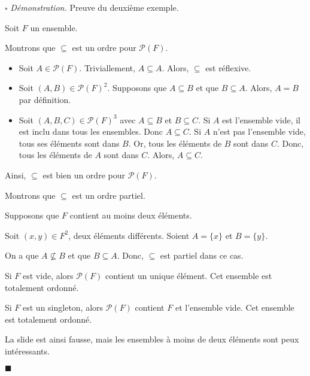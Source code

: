 \documentclass[a4paper, titlepage]{article}
\renewenvironment{proof}{\par$\square$ \footnotesize\textit{Démonstration.}}{\begin{flushright}$\blacksquare$\end{flushright}\par}
\begin{document}
    \begin{proof}
        Preuve du deuxième exemple.

        Soit $F$ un ensemble.

        Montrons que $\subseteq$ est un ordre pour $\mathcal{P}(F)$.
        \begin{itemize}
            \item Soit $A\in\mathcal{P}(F)$.
                Triviallement, $A\subseteq A$.
                Alors, $\subseteq$ est réflexive.
            \item Soit $(A,B)\in\mathcal{P}(F)^2$.
                Supposons que $A\subseteq B$ et que $B\subseteq A$.
                Alors, $A=B$ par définition.
            \item Soit $(A,B,C)\in\mathcal{P}(F)^3$ avec $A\subseteq B$ et $B\subseteq C$.
                Si $A$ est l'ensemble vide, il est inclu dans tous les ensembles. 
                Donc $A\subseteq C$.
                Si $A$ n'est pas l'ensemble vide, tous ses éléments sont dans $B$. 
                Or, tous les éléments de $B$ sont dans $C$.
                Donc, tous les éléments de $A$ sont dans $C$.
                Alors, $A\subseteq C$.
        \end{itemize}
        Ainsi, $\subseteq$ est bien un ordre pour $\mathcal{P}(F)$.

        Montrons que $\subseteq$ est un ordre partiel.

        Supposons que $F$ contient au moins deux éléments.

        Soit $(x,y)\in F^2$, deux éléments différents.
        Soient $A=\{x\}$ et $B=\{y\}$.

        On a que $A\not\subseteq B$ et que $B\subseteq A$.
        Donc, $\subseteq$ est partiel dans ce cas.

        Si $F$ est vide, alors $\mathcal{P}(F)$ contient un unique élément.
        Cet ensemble est totalement ordonné.

        Si $F$ est un singleton, alors $\mathcal{P}(F)$ contient $F$ et l'ensemble vide.
        Cet ensemble est totalement ordonné.

        La slide est ainsi fausse, mais les ensembles à moins de deux éléments sont peux intéressants.
    \end{proof}
\end{document}
